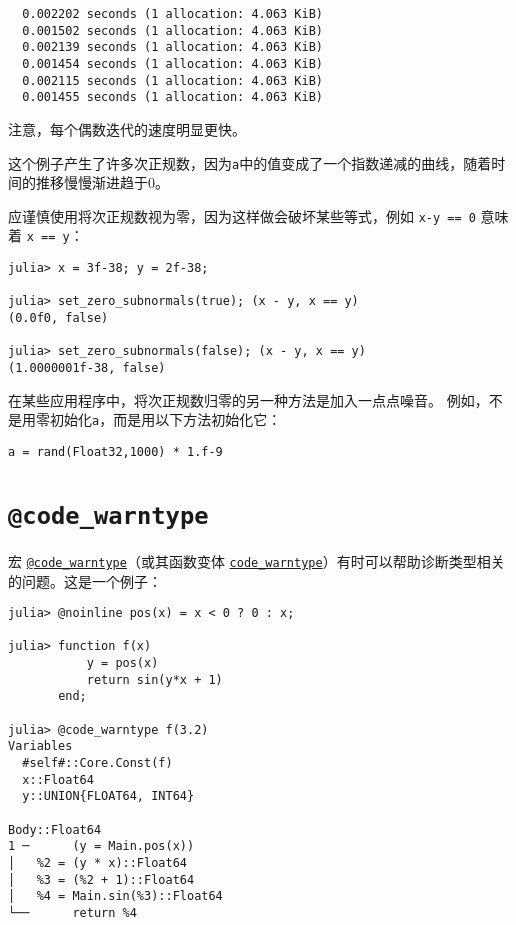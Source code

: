 \begin{lstlisting}
  0.002202 seconds (1 allocation: 4.063 KiB)
  0.001502 seconds (1 allocation: 4.063 KiB)
  0.002139 seconds (1 allocation: 4.063 KiB)
  0.001454 seconds (1 allocation: 4.063 KiB)
  0.002115 seconds (1 allocation: 4.063 KiB)
  0.001455 seconds (1 allocation: 4.063 KiB)
\end{lstlisting}



注意，每个偶数迭代的速度明显更快。



这个例子产生了许多次正规数，因为\texttt{a}中的值变成了一个指数递减的曲线，随着时间的推移慢慢渐进趋于0。



应谨慎使用将次正规数视为零，因为这样做会破坏某些等式，例如 \texttt{x-y == 0} 意味着 \texttt{x == y}：




\begin{verbatim}
julia> x = 3f-38; y = 2f-38;

julia> set_zero_subnormals(true); (x - y, x == y)
(0.0f0, false)

julia> set_zero_subnormals(false); (x - y, x == y)
(1.0000001f-38, false)
\end{verbatim}



在某些应用程序中，将次正规数归零的另一种方法是加入一点点噪音。 例如，不是用零初始化\texttt{a}，而是用以下方法初始化它：




\begin{verbatim}
a = rand(Float32,1000) * 1.f-9
\end{verbatim}



\hypertarget{7082991166860772411}{}


\section{\texttt{@code\_warntype}}



宏 \hyperlink{8092893264277772840}{\texttt{@code\_warntype}}（或其函数变体 \hyperlink{5565852192659724503}{\texttt{code\_warntype}}）有时可以帮助诊断类型相关的问题。这是一个例子：




\begin{verbatim}
julia> @noinline pos(x) = x < 0 ? 0 : x;

julia> function f(x)
           y = pos(x)
           return sin(y*x + 1)
       end;

julia> @code_warntype f(3.2)
Variables
  #self#::Core.Const(f)
  x::Float64
  y::UNION{FLOAT64, INT64}

Body::Float64
1 ─      (y = Main.pos(x))
│   %2 = (y * x)::Float64
│   %3 = (%2 + 1)::Float64
│   %4 = Main.sin(%3)::Float64
└──      return %4
\end{verbatim}



